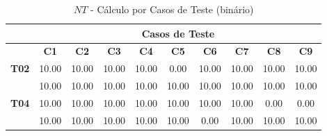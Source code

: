 \begin{table}[htbp]
	\centering
	\caption{$NT$ - Cálculo por Casos de Teste (binário)}
	\begin{tabular}{c|ccccccccc|}
		\cline{2-10}
		\rowcolor[HTML]{D0CECE} 
		\cellcolor[HTML]{F2F2F2}\textbf{} & \multicolumn{9}{c|}{\cellcolor[HTML]{D0CECE}\textbf{Casos de Teste}} \\ \hline
		\rowcolor[HTML]{D9D9D9} 
		\multicolumn{1}{|c|}{\cellcolor[HTML]{D0CECE}\textbf{Participante}} & \multicolumn{1}{c|}{\cellcolor[HTML]{D9D9D9}\textbf{C1}} & \multicolumn{1}{c|}{\cellcolor[HTML]{D9D9D9}\textbf{C2}} & \multicolumn{1}{c|}{\cellcolor[HTML]{D9D9D9}\textbf{C3}} & \multicolumn{1}{c|}{\cellcolor[HTML]{D9D9D9}\textbf{C4}} & \multicolumn{1}{c|}{\cellcolor[HTML]{D9D9D9}\textbf{C5}} & \multicolumn{1}{c|}{\cellcolor[HTML]{D9D9D9}\textbf{C6}} & \multicolumn{1}{c|}{\cellcolor[HTML]{D9D9D9}\textbf{C7}} & \multicolumn{1}{c|}{\cellcolor[HTML]{D9D9D9}\textbf{C8}} & \textbf{C9} \\ \hline
		\multicolumn{1}{|c|}{\textbf{T02}} & \multicolumn{1}{c|}{10.00} & \multicolumn{1}{c|}{10.00} & \multicolumn{1}{c|}{10.00} & \multicolumn{1}{c|}{10.00} & \multicolumn{1}{c|}{0.00} & \multicolumn{1}{c|}{10.00} & \multicolumn{1}{c|}{10.00} & \multicolumn{1}{c|}{10.00} & 10.00 \\ \hline
		\rowcolor[HTML]{F2F2F2} 
		\multicolumn{1}{|c|}{\cellcolor[HTML]{F2F2F2}\textbf{T03}} & \multicolumn{1}{c|}{\cellcolor[HTML]{F2F2F2}10.00} & \multicolumn{1}{c|}{\cellcolor[HTML]{F2F2F2}10.00} & \multicolumn{1}{c|}{\cellcolor[HTML]{F2F2F2}10.00} & \multicolumn{1}{c|}{\cellcolor[HTML]{F2F2F2}10.00} & \multicolumn{1}{c|}{\cellcolor[HTML]{F2F2F2}10.00} & \multicolumn{1}{c|}{\cellcolor[HTML]{F2F2F2}10.00} & \multicolumn{1}{c|}{\cellcolor[HTML]{F2F2F2}10.00} & \multicolumn{1}{c|}{\cellcolor[HTML]{F2F2F2}10.00} & 10.00 \\ \hline
		\multicolumn{1}{|c|}{\textbf{T04}} & \multicolumn{1}{c|}{10.00} & \multicolumn{1}{c|}{10.00} & \multicolumn{1}{c|}{10.00} & \multicolumn{1}{c|}{10.00} & \multicolumn{1}{c|}{10.00} & \multicolumn{1}{c|}{10.00} & \multicolumn{1}{c|}{10.00} & \multicolumn{1}{c|}{0.00} & 0.00 \\ \hline
		\rowcolor[HTML]{F2F2F2} 
		\multicolumn{1}{|c|}{\cellcolor[HTML]{F2F2F2}\textbf{T05}} & \multicolumn{1}{c|}{\cellcolor[HTML]{F2F2F2}10.00} & \multicolumn{1}{c|}{\cellcolor[HTML]{F2F2F2}10.00} & \multicolumn{1}{c|}{\cellcolor[HTML]{F2F2F2}10.00} & \multicolumn{1}{c|}{\cellcolor[HTML]{F2F2F2}10.00} & \multicolumn{1}{c|}{\cellcolor[HTML]{F2F2F2}10.00} & \multicolumn{1}{c|}{\cellcolor[HTML]{F2F2F2}0.00} & \multicolumn{1}{c|}{\cellcolor[HTML]{F2F2F2}10.00} & \multicolumn{1}{c|}{\cellcolor[HTML]{F2F2F2}10.00} & 10.00 \\ \hline

\end{tabular}
\end{table}
